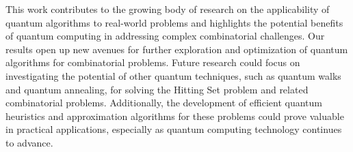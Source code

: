 This work contributes to the growing body of research on the applicability of quantum algorithms to real-world problems and highlights the potential benefits of quantum computing in addressing complex combinatorial challenges. Our results open up new avenues for further exploration and optimization of quantum algorithms for combinatorial problems. Future research could focus on investigating the potential of other quantum techniques, such as quantum walks and quantum annealing, for solving the Hitting Set problem and related combinatorial problems. Additionally, the development of efficient quantum heuristics and approximation algorithms for these problems could prove valuable in practical applications, especially as quantum computing technology continues to advance.

